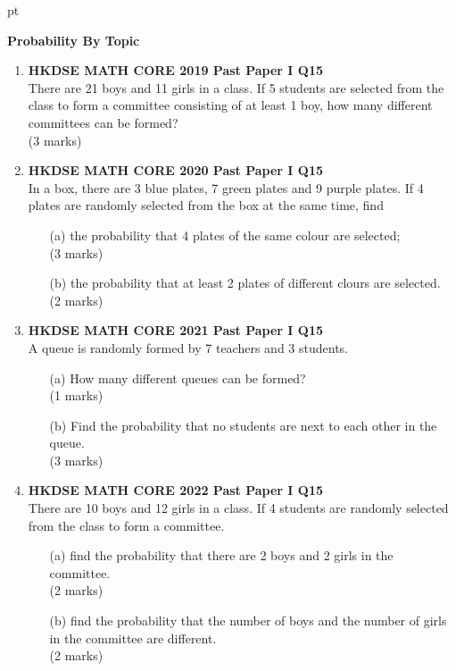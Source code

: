 \documentclass[12pt]{article}
\begin{document}
 pt
\begin{center}
	{\large \bf Probability By Topic}
\end{center}
\vspace{0.05cm}

\begin{enumerate}
	\item \textbf{HKDSE MATH CORE 2019 Past Paper I Q15}\\
	There are 21 boys and 11 girls in a class. If 5 students are selected from the class to form a committee consisting of at least 1 boy, how many different committees can be formed?	 \\(3 marks)

    \item \textbf{HKDSE MATH CORE 2020 Past Paper I Q15}\\
	In a box, there are 3 blue plates, 7 green plates and 9 purple plates. If 4 plates are randomly selected from the box at the same time, find
	\begin{enumerate}
		\item[(a)] the probability that 4 plates of the same colour are selected; \\(3 marks)
		\item[(b)] the probability that at least 2 plates of different clours are selected. \\(2 marks)
	\end{enumerate}


    \item \textbf{HKDSE MATH CORE 2021 Past Paper I Q15}\\
	A queue is randomly formed by 7 teachers and 3 students.
	\begin{enumerate}
		\item[(a)] How many different queues can be formed? \\(1 marks)
		\item[(b)] Find the probability that no students are next to each other in the queue. \\(3 marks)
	\end{enumerate}


	\item \textbf{HKDSE MATH CORE 2022 Past Paper I Q15}\\
	There are 10 boys and 12 girls in a class. If 4 students are randomly selected from the class to form a committee.
	\begin{enumerate}
		\item[(a)] find the probability that there are 2 boys and 2 girls in the committee. \\(2 marks)
		\item[(b)] find the probability that the number of boys and the number of girls in the committee are different. \\(2 marks)
	\end{enumerate}





\end{enumerate}
\end{document}
